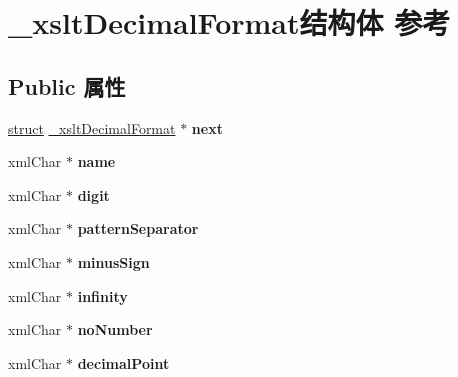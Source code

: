 \hypertarget{struct__xslt_decimal_format}{}\section{\+\_\+xslt\+Decimal\+Format结构体 参考}
\label{struct__xslt_decimal_format}
\subsection*{Public 属性}
\begin{DoxyCompactItemize}
\item 
\mbox{\label{struct__xslt_decimal_format_af2a93f7d06bdb868fc11cf0a7915342f}} 
\hyperlink{interfacestruct}{struct} \hyperlink{struct__xslt_decimal_format}{\+\_\+xslt\+Decimal\+Format} $\ast$ {\bfseries next}
\item 
\mbox{\label{struct__xslt_decimal_format_a8067896532bb595a2d9c1504320a863a}} 
xml\+Char $\ast$ {\bfseries name}
\item 
\mbox{\label{struct__xslt_decimal_format_af4c8c3e149583e59ae0a1e3d372b5546}} 
xml\+Char $\ast$ {\bfseries digit}
\item 
\mbox{\label{struct__xslt_decimal_format_ad43c6ab1f687fba710fa8cef08221a35}} 
xml\+Char $\ast$ {\bfseries pattern\+Separator}
\item 
\mbox{\label{struct__xslt_decimal_format_ac5d2f7cc202c10150c87412460d734ec}} 
xml\+Char $\ast$ {\bfseries minus\+Sign}
\item 
\mbox{\label{struct__xslt_decimal_format_a52c3a5bf4e68c246d86a2e08ecbace04}} 
xml\+Char $\ast$ {\bfseries infinity}
\item 
\mbox{\label{struct__xslt_decimal_format_ae917e159b47abda3aa3da7a0bfe5835e}} 
xml\+Char $\ast$ {\bfseries no\+Number}
\item 
\mbox{\label{struct__xslt_decimal_format_a718217d08b75cefb80dab18fd52e1b62}} 
xml\+Char $\ast$ {\bfseries decimal\+Point}

\end{DoxyCompactItemize}
